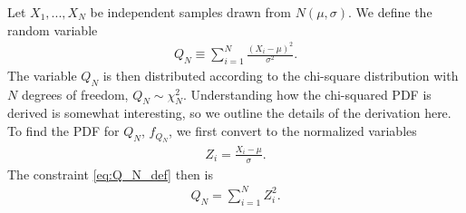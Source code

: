 Let $X_1,...,X_N$ be independent samples drawn from $N\left(\mu,\sigma\right)$. 
We define the random variable
\begin{align}
    \label{eq:Q_N_def}
    Q_N 
    \equiv
    \sum_{i=1}^N\frac{\left(X_i-\mu\right)^2}{\sigma^2}
    .
\end{align}
The variable $Q_N$ is then distributed according to the chi-square distribution
with $N$ degrees of freedom, $Q_N\sim\chi_N^2$.
Understanding how the chi-squared PDF is derived is somewhat interesting, so we outline the details of the derivation here.
To find the PDF for $Q_N$, $f_{Q_N}$, we first convert to the normalized variables
\begin{align}
    Z_i = \frac{X_i-\mu}{\sigma}
    .
\end{align}
The constraint \eqref{eq:Q_N_def} then is
\begin{align}
    \label{eq:Q_N_Z}
    Q_N
    =
    \sum_{i=1}^NZ_i^2
    .
\end{align}

